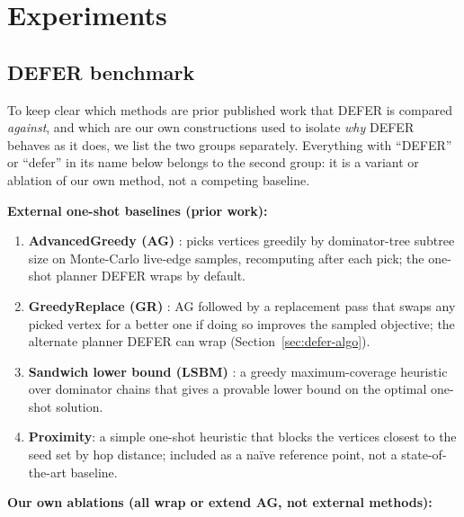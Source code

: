 \documentclass[ASNA,number]{USG}
\begin{document}
\section{Experiments}\label{sec:experiments}

\subsection{DEFER benchmark}\label{sec:defer-experiments}

To keep clear which methods are prior published work that DEFER is
compared \emph{against}, and which are our own constructions used to
isolate \emph{why} DEFER behaves as it does, we list the two groups
separately. Everything with ``DEFER'' or ``defer'' in its name below
belongs to the second group: it is a variant or ablation of our own
method, not a competing baseline.

\noindent\textbf{External one-shot baselines (prior work):}

\begin{enumerate}
\item \textbf{AdvancedGreedy (AG)} \citep{xie2024}: picks vertices
  greedily by dominator-tree subtree size on Monte-Carlo live-edge
  samples, recomputing after each pick; the one-shot planner DEFER wraps
  by default.
\item \textbf{GreedyReplace (GR)} \citep{xie2024}: AG followed by a
  replacement pass that swaps any picked vertex for a better one if doing
  so improves the sampled objective; the alternate planner DEFER can wrap
  (Section~\ref{sec:defer-algo}).
\item \textbf{Sandwich lower bound (LSBM)} \citep{wang2024sandwich}: a
  greedy maximum-coverage heuristic over dominator chains that gives a
  provable lower bound on the optimal one-shot solution.
\item \textbf{Proximity}: a simple one-shot heuristic that blocks the
  vertices closest to the seed set by hop distance; included as a
  na\"ive reference point, not a state-of-the-art baseline.
\end{enumerate}

\noindent\textbf{Our own ablations (all wrap or extend AG, not external
methods):}
\end{document}
